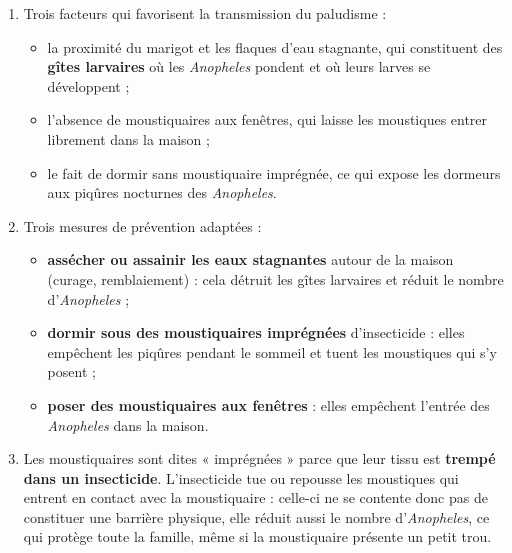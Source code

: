 \documentclass[11pt]{article}
\begin{document}
\begin{corrige}
\begin{enumerate}
\item Trois facteurs qui favorisent la transmission du paludisme :
\begin{itemize}
\item la proximité du marigot et les flaques d'eau stagnante, qui constituent des \textbf{gîtes larvaires} où les \emph{Anopheles} pondent et où leurs larves se développent ;
\item l'absence de moustiquaires aux fenêtres, qui laisse les moustiques entrer librement dans la maison ;
\item le fait de dormir sans moustiquaire imprégnée, ce qui expose les dormeurs aux piqûres nocturnes des \emph{Anopheles}.
\end{itemize}
\item Trois mesures de prévention adaptées :
\begin{itemize}
\item \textbf{assécher ou assainir les eaux stagnantes} autour de la maison (curage, remblaiement) : cela détruit les gîtes larvaires et réduit le nombre d'\emph{Anopheles} ;
\item \textbf{dormir sous des moustiquaires imprégnées} d'insecticide : elles empêchent les piqûres pendant le sommeil et tuent les moustiques qui s'y posent ;
\item \textbf{poser des moustiquaires aux fenêtres} : elles empêchent l'entrée des \emph{Anopheles} dans la maison.
\end{itemize}
\item Les moustiquaires sont dites « imprégnées » parce que leur tissu est \textbf{trempé dans un insecticide}. L'insecticide tue ou repousse les moustiques qui entrent en contact avec la moustiquaire : celle-ci ne se contente donc pas de constituer une barrière physique, elle réduit aussi le nombre d'\emph{Anopheles}, ce qui protège toute la famille, même si la moustiquaire présente un petit trou.
\end{enumerate}
\end{corrige}
\end{document}
